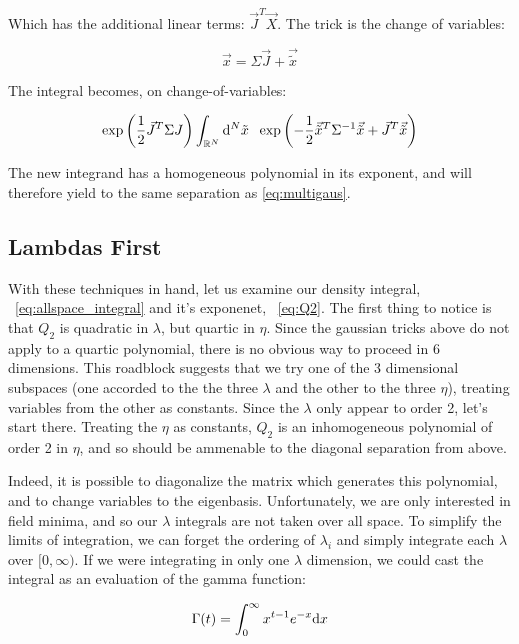 \documentclass[10pt,letterpaper]{article}
\def\d{{\rm d}}  %
\begin{document}
Which has the additional linear terms: $\vec{J}^T \vec{X}$. The trick is the change of variables:

$$\vec{x} = \Sigma \vec{J} + \vec{\tilde{x}}$$

The integral becomes, on change-of-variables:

\begin{equation} \label{eq:multigaus_lintrick}
\exp\left(\frac{1}{2}\vec{J}^T \Sigma J\right) \int_{\mathbb{R}^N} \d^N \tilde{x} \hspace{0.5pc} \exp\left(-\frac{1}{2} \vec{\tilde{x}}^T \Sigma^{-1} \vec{\tilde{x}} + \vec{J}^T \vec{\tilde{x}}\right)
\end{equation}

The new integrand has a homogeneous polynomial in its exponent, and will therefore yield to the same separation as \ref{eq:multigaus}.

\subsection{Lambdas First} \label{lambdasec}

With these techniques in hand, let us examine our density integral, ~\ref{eq:allspace_integral} and it's exponenet, ~\ref{eq:Q2}. The first thing to notice is that $Q_2$ is quadratic in $\lambda$, but quartic in $\eta$. Since the gaussian tricks above do not apply to a quartic polynomial, there is no obvious way to proceed in 6 dimensions. This roadblock suggests that we try one of the 3 dimensional subspaces (one accorded to the the three $\lambda$ and the other to the three $\eta$), treating variables from the other as constants. Since the $\lambda$ only appear to order 2, let's start there. Treating the $\eta$ as constants, $Q_2$ is an inhomogeneous polynomial of order 2 in $\eta$, and so should be ammenable to the diagonal separation from above.
\par Indeed, it is possible to diagonalize the matrix which generates this polynomial, and to change variables to the eigenbasis. Unfortunately, we are only interested in field minima, and so our $\lambda$ integrals are not taken over all space. To simplify the limits of integration, we can forget the ordering of $\lambda_i$ and simply integrate each $\lambda$ over $[0,\infty)$. If we were integrating in only one $\lambda$ dimension, we could cast the integral as an evaluation of the gamma function:

\begin{equation} \label{eq:gamma}
\Gamma(t) = \int_{0}^{\infty} x^{t-1} e^{-x} \d x
\end{equation}
\end{document}
